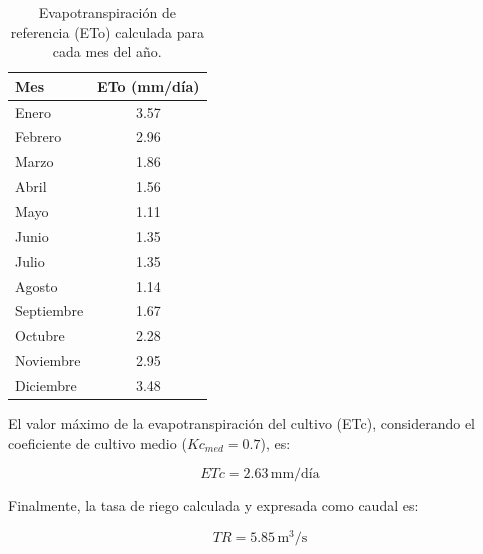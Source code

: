 \documentclass{article}  %
\begin{document}
\begin{table}[H]
\centering
\begin{tabular}{|l|c|}
\hline
\textbf{Mes} & \textbf{ETo (mm/día)} \\ \hline
Enero        & 3.57                  \\ \hline
Febrero      & 2.96                  \\ \hline
Marzo        & 1.86                  \\ \hline
Abril        & 1.56                  \\ \hline
Mayo         & 1.11                  \\ \hline
Junio        & 1.35                  \\ \hline
Julio        & 1.35                  \\ \hline
Agosto       & 1.14                  \\ \hline
Septiembre   & 1.67                  \\ \hline
Octubre      & 2.28                  \\ \hline
Noviembre    & 2.95                  \\ \hline
Diciembre    & 3.48                  \\ \hline
\end{tabular}
\caption{Evapotranspiración de referencia (ETo) calculada para cada mes del año.}
\end{table}

El valor máximo de la evapotranspiración del cultivo (ETc), considerando el coeficiente de cultivo medio ($Kc_{med} = 0.7$), es:

\begin{equation}
ETc = 2.63 \, \text{mm/día}
\end{equation}

Finalmente, la tasa de riego calculada y expresada como caudal es:

\begin{equation}
TR = 5.85 \, \text{m}^3/\text{s}
\end{equation}

  
\end{document}
